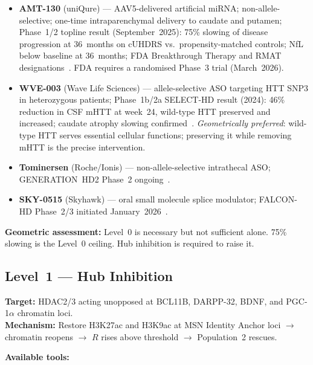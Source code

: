 \documentclass[12pt,a4paper]{article}
\newcommand{\Rratio}{R}
\begin{document}
\begin{itemize}
  \item \textbf{AMT-130} (uniQure) --- AAV5-delivered
    artificial miRNA; non-allele-selective; one-time
    intraparenchymal delivery to caudate and putamen;
    Phase~1/2 topline result (September~2025): 75\%
    slowing of disease progression at 36~months on cUHDRS
    vs.\ propensity-matched controls; NfL below baseline
    at 36~months; FDA Breakthrough Therapy and RMAT
    designations~\cite{AMT130_2025}. FDA requires a
    randomised Phase~3 trial (March~2026).

  \item \textbf{WVE-003} (Wave Life Sciences) ---
    allele-selective ASO targeting HTT SNP3 in
    heterozygous patients; Phase~1b/2a SELECT-HD result
    (2024): 46\% reduction in CSF mHTT at week~24,
    wild-type HTT preserved and increased; caudate atrophy
    slowing confirmed~\cite{WVE003_2024}.
    \emph{Geometrically preferred}: wild-type HTT serves
    essential cellular functions; preserving it while
    removing mHTT is the precise intervention.

  \item \textbf{Tominersen} (Roche/Ionis) ---
    non-allele-selective intrathecal ASO; GENERATION~HD2
    Phase~2 ongoing~\cite{GenHD2}.

  \item \textbf{SKY-0515} (Skyhawk) --- oral small
    molecule splice modulator; FALCON-HD Phase~2/3
    initiated January~2026~\cite{SKY0515}.
\end{itemize}

\textbf{Geometric assessment:}
Level~0 is necessary but not sufficient alone.
75\% slowing is the Level~0 ceiling. Hub inhibition is
required to raise it.

\subsection{Level~1 --- Hub Inhibition}

\textbf{Target:} HDAC2/3 acting unopposed at BCL11B,
DARPP-32, BDNF, and PGC-1$\alpha$ chromatin loci.\\
\textbf{Mechanism:} Restore H3K27ac and H3K9ac at MSN
Identity Anchor loci $\to$ chromatin reopens $\to$
$\Rratio$ rises above threshold $\to$ Population~2 rescues.

\medskip\noindent\textbf{Available tools:}
\end{document}
